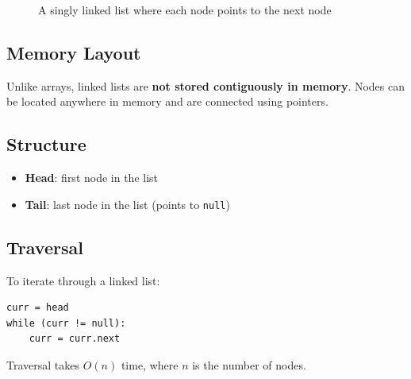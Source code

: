 \documentclass{article}
\begin{document}
\begin{figure}[h]
\centering
{}
\caption{A singly linked list where each node points to the next node}
\end{figure}



\subsection{Memory Layout}
Unlike arrays, linked lists are \textbf{not stored contiguously in memory}.  
Nodes can be located anywhere in memory and are connected using pointers.

\subsection{Structure}
\begin{itemize}
  \item \textbf{Head}: first node in the list
  \item \textbf{Tail}: last node in the list (points to \texttt{null})
\end{itemize}


\subsection{Traversal}
To iterate through a linked list:
\begin{verbatim}
curr = head
while (curr != null):
    curr = curr.next
\end{verbatim}
Traversal takes $O(n)$ time, where $n$ is the number of nodes.
\end{document}
